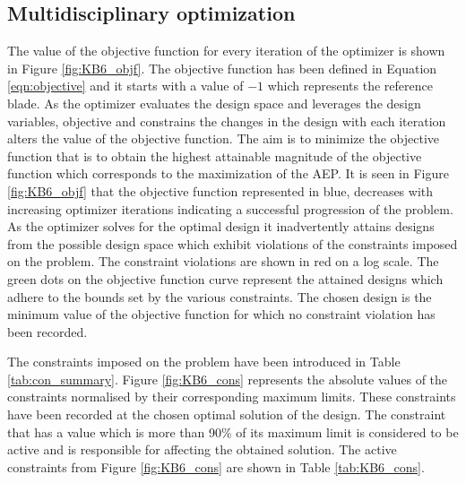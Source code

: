 \subsection{Multidisciplinary optimization}
\label{subsec:MDO}
The value of the objective function for every iteration of the optimizer is shown in Figure \ref{fig:KB6_objf}. The objective function has been defined in Equation \ref{eqn:objective} and it starts with a value of $-1$ which represents the reference blade. As the optimizer evaluates the design space and leverages the design variables, objective and constrains the changes in the design with each iteration alters the value of the objective function. The aim is to minimize the objective function that is to obtain the highest attainable magnitude of the objective function which corresponds to the maximization of the AEP. It is seen in Figure \ref{fig:KB6_objf} that the objective function represented in blue, decreases with increasing optimizer iterations indicating a successful progression of the problem. As the optimizer solves for the optimal design it inadvertently attains designs from the possible design space which exhibit violations of the constraints imposed on the problem. The constraint violations are shown in red on a log scale. The green dots on the objective function curve represent the attained designs which adhere to the bounds set by the various constraints. The chosen design is the minimum value of the objective function for which no constraint violation has been recorded.

The constraints imposed on the problem have been introduced in Table \ref{tab:con_summary}. Figure \ref{fig:KB6_cons} represents the absolute values of the constraints normalised by their corresponding maximum limits. These constraints have been recorded at the chosen optimal solution of the design. The constraint that has a value which is more than 90\% of its maximum limit is considered to be active and is responsible for affecting the obtained solution. The active constraints from Figure \ref{fig:KB6_cons} are shown in Table \ref{tab:KB6_cons}.

